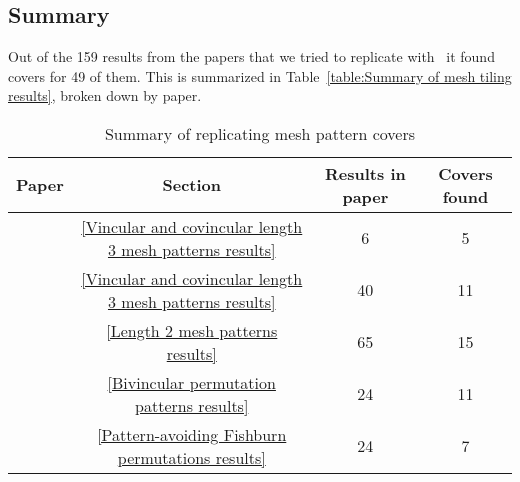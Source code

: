 \subsection{Summary}

Out of the 159 results from the papers that we tried to replicate with \CombCov\ 
it found covers for 49 of them. This is summarized in Table~\ref{table:Summary 
of mesh tiling results}, broken down by paper.

\begin{table}[ht]
    \centering
    \begin{tabular}{ l | c | c | c }
        Paper & Section & Results in paper & Covers found \\ \hline
        \cite{claesson_generalized_2001} & \ref{Vincular and covincular length 3 mesh patterns results} & 6 & 5 \\
        \cite{bean_enumerations_2017} & \ref{Vincular and covincular length 3 mesh patterns results} & 40 & 11 \\
        \cite{hilmarsson_wilf-classification_2015} & \ref{Length 2 mesh patterns results} & 65 & 15 \\
        \cite{parviainen_wilf_2009} & \ref{Bivincular permutation patterns results} & 24 & 11 \\
        \cite{gil_pattern-avoiding_2018} & \ref{Pattern-avoiding Fishburn permutations results} & 24 & 7 
    \end{tabular}
    \caption{Summary of replicating mesh pattern covers}
    \label{table:Summary of mesh tiling results}
\end{table}
